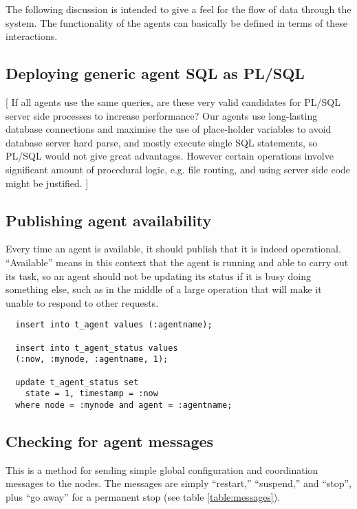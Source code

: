 \documentclass{cmspaper}
\begin{document}
The following discussion is intended to give a feel for the flow of data through the system. The functionality of the agents can basically be defined in terms of these interactions.

\subsection{Deploying generic agent SQL as PL/SQL}

[ If all agents use the same queries, are these very valid candidates for PL/SQL server side processes to increase performance?  Our agents use long-lasting database connections and maximise the use of place-holder variables to avoid database server hard parse, and mostly execute single SQL statements, so PL/SQL would not give great advantages.  However certain operations involve significant amount of procedural logic, e.g. file routing, and using server side code might be justified. ]

\subsection{Publishing agent availability}

Every time an agent is available, it should publish that it is indeed operational.  ``Available'' means in this context that the agent is running and able to carry out its task, so an agent should not be updating its status if it is busy doing something else, such as in the middle of a large operation that will make it unable to respond to other requests.

{\small\begin{verbatim}
  insert into t_agent values (:agentname);

  insert into t_agent_status values
  (:now, :mynode, :agentname, 1);

  update t_agent_status set
    state = 1, timestamp = :now
  where node = :mynode and agent = :agentname;
\end{verbatim}}

\subsection{Checking for agent messages}

This is a  method for sending simple global configuration and coordination messages to the nodes.  The messages are simply ``restart,'' ``suspend,'' and ``stop'', plus ``go away'' for a permanent stop (see table \ref{table:messages}).
\end{document}
